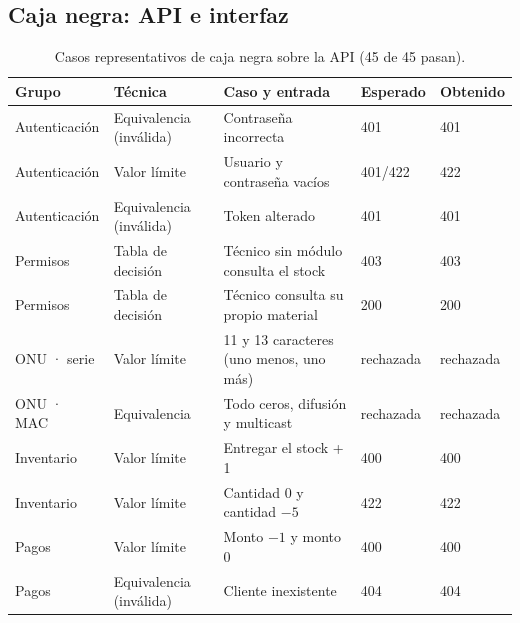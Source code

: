 \subsection{Caja negra: API e interfaz}

\begin{table}[H]
\centering
\caption{Casos representativos de caja negra sobre la API (45 de 45 pasan).}
\label{tab:ce02-e4-api}
\small
\begin{tabularx}{\textwidth}{L{2cm}L{2.4cm}XC{1.5cm}C{1.5cm}}
\toprule
\textbf{Grupo} & \textbf{Técnica} & \textbf{Caso y entrada} & \textbf{Esperado} & \textbf{Obtenido} \\
\midrule
Autenticación & Equivalencia (inválida) & Contraseña incorrecta & 401 & 401 \\
Autenticación & Valor límite & Usuario y contraseña vacíos & 401/422 & 422 \\
Autenticación & Equivalencia (inválida) & Token alterado & 401 & 401 \\
Permisos & Tabla de decisión & Técnico sin módulo consulta el stock & 403 & 403 \\
Permisos & Tabla de decisión & Técnico consulta su propio material & 200 & 200 \\
ONU · serie & Valor límite & 11 y 13 caracteres (uno menos, uno más) & rechazada & rechazada \\
ONU · MAC & Equivalencia & Todo ceros, difusión y multicast & rechazada & rechazada \\
Inventario & Valor límite & Entregar el stock + 1 & 400 & 400 \\
Inventario & Valor límite & Cantidad 0 y cantidad $-5$ & 422 & 422 \\
Pagos & Valor límite & Monto $-1$ y monto 0 & 400 & 400 \\
Pagos & Equivalencia (inválida) & Cliente inexistente & 404 & 404 \\
\bottomrule
\end{tabularx}
\end{table}

